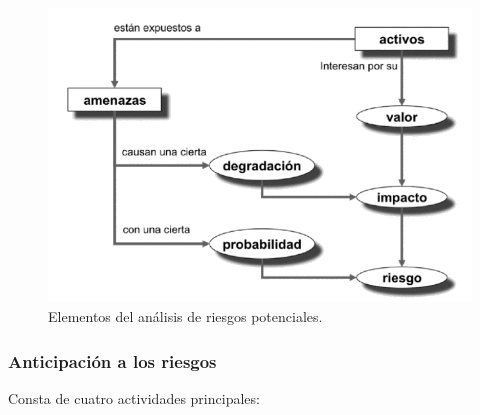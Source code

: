 \begin{figure}[H]
   \centering
   \includegraphics[width=0.6\linewidth]{Resources/Tema3/relacionesDefinicionesRiesgos.png}
   \caption{Elementos del análisis de riesgos potenciales.}
   \label{fig:relacionesDefinicionesRiesgos}
\end{figure}

\subsubsection{Anticipación a los riesgos}

Consta de cuatro actividades principales:

